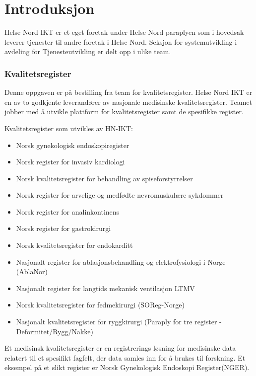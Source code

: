 \section{Introduksjon}

Helse Nord IKT er et eget foretak under Helse Nord paraplyen som i hovedsak leverer tjenester til andre foretak i Helse Nord. Seksjon for systemutvikling i avdeling for Tjenesteutvikling er delt opp i ulike team. 

\subsubsection*{Kvalitetsregister}

Denne oppgaven er på bestilling fra team for kvalitetsregister. Helse Nord IKT er en av to godkjente leverandører av nasjonale medisinske kvalitetsregister. Teamet jobber med å utvikle plattform for kvalitetsregister samt de spesifikke register.

Kvalitetsregister som utvikles av HN-IKT:
\begin{itemize}
    \item Norsk gynekologisk endoskopiregister\cite{1-kvalitetsregistre.no}
    \item Norsk register for invasiv kardiologi\cite{1-ablanor}
    \item Norsk kvalitetsregister for behandling av spiseforstyrrelser\cite{1-Norspis}
    \item Norsk register for arvelige og medfødte nevromuskulære sykdommer\cite{1-muskel}
    \item Norsk register for analinkontinens\cite{1-nra}
    \item Norsk register for gastrokirurgi\cite{1-norgast}
    \item Norsk kvalitetsregister for endokarditt\cite{1-endokarditt}
    \item Nasjonalt register for ablasjonsbehandling og elektrofysiologi i Norge (AblaNor)\cite{1-ablanor}
    \item Nasjonalt register for langtids mekanisk ventilasjon LTMV\cite{1-langmek}
    \item Norsk kvalitetsregister for fedmekirurgi (SOReg-Norge)\cite{1-soreg}
    \item Nasjonalt kvalitetsregister for ryggkirurgi (Paraply for tre register - Deformitet/Rygg/Nakke)\cite{1-rygg}
\end{itemize}

Et medisinsk kvalitetsregister er en registrerings løsning for medisinske data relatert til et spesifikt fagfelt, der data samles inn for å brukes til forskning. Et eksempel på et slikt register er Norsk Gynekologisk Endoskopi Register(NGER).

